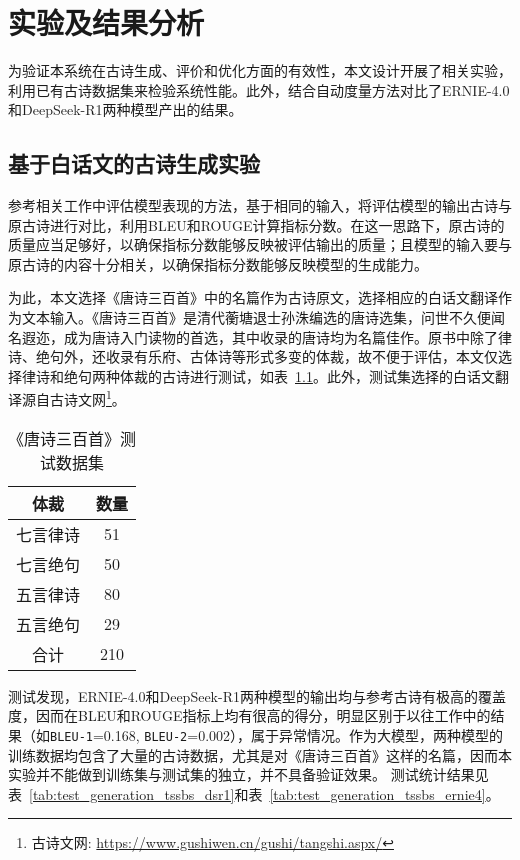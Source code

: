 
\chapter{实验及结果分析}

为验证本系统在古诗生成、评价和优化方面的有效性，本文设计开展了相关实验，利用已有古诗数据集来检验系统性能。此外，结合自动度量方法对比了ERNIE-4.0和DeepSeek-R1两种模型产出的结果。

\section{基于白话文的古诗生成实验}

参考相关工作中评估模型表现的方法，基于相同的输入，将评估模型的输出古诗与原古诗进行对比，利用BLEU和ROUGE计算指标分数。在这一思路下，原古诗的质量应当足够好，以确保指标分数能够反映被评估输出的质量；且模型的输入要与原古诗的内容十分相关，以确保指标分数能够反映模型的生成能力。

为此，本文选择《唐诗三百首》中的名篇作为古诗原文，选择相应的白话文翻译作为文本输入。《唐诗三百首》是清代蘅塘退士孙洙编选的唐诗选集，问世不久便闻名遐迩，成为唐诗入门读物的首选，其中收录的唐诗均为名篇佳作。原书中除了律诗、绝句外，还收录有乐府、古体诗等形式多变的体裁，故不便于评估，本文仅选择律诗和绝句两种体裁的古诗进行测试，如表~\ref{tab:test_generation_data}。此外，测试集选择的白话文翻译源自古诗文网\footnote{古诗文网: \url{https://www.gushiwen.cn/gushi/tangshi.aspx/}}。


\begin{table}[ht]
    \centering
    \caption{《唐诗三百首》测试数据集}
    \label{tab:test_generation_data}
    \begin{tabular}{|c|c|}
      \hline
      \bf{体裁}& \bf{数量} \\
      \hline
      七言律诗& 51\\
      \hline
      七言绝句& 50\\
      \hline
      五言律诗& 80\\
      \hline
      五言绝句& 29\\
      \hline
      合计& 210\\
      \hline
    \end{tabular}
  \end{table}

测试发现，ERNIE-4.0和DeepSeek-R1两种模型的输出均与参考古诗有极高的覆盖度，因而在BLEU和ROUGE指标上均有很高的得分，明显区别于以往工作中的结果（如\verb|BLEU-1|=0.168, \verb|BLEU-2|=0.002\cite{chenPolishingModelMachineGenerated2024}），属于异常情况。作为大模型，两种模型的训练数据均包含了大量的古诗数据，尤其是对《唐诗三百首》这样的名篇，因而本实验并不能做到训练集与测试集的独立，并不具备验证效果。
测试统计结果见表~\ref{tab:test_generation_tssbs_dsr1}和表~\ref{tab:test_generation_tssbs_ernie4}。


